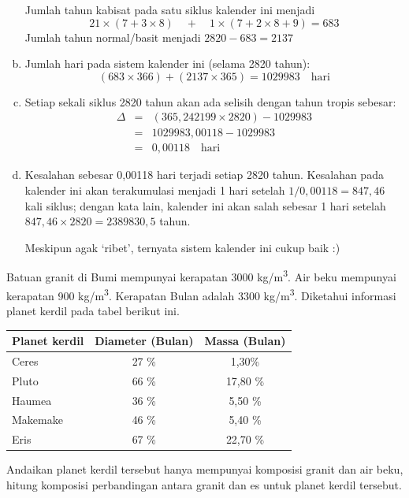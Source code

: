\documentclass[11pt,fleqn]{exam}
\begin{document}
\begin{questions}
\begin{enumerate}[(a)]
Jumlah tahun kabisat pada satu siklus kalender ini menjadi 
$$21 \times (7 + 3 \times 8) \quad + \quad 1 \times (7 + 2 \times 8 + 9) = 683$$
Jumlah tahun normal/basit menjadi $2820 - 683 = 2137$


\item Jumlah hari pada sistem kalender ini (selama 2820 tahun):
$$(683 \times 366) + (2137 \times 365) = 1029983 \quad \text{hari}$$

\item Setiap sekali siklus 2820 tahun akan ada selisih dengan tahun tropis sebesar:
\begin{eqnarray*}
\Delta &=& (365,242199 \times 2820) - 1029983 \\
&=& 1029983,00118 - 1029983 \\
&=& 0,00118 \quad \text{hari}
\end{eqnarray*}

\item Kesalahan sebesar 0,00118 hari terjadi setiap 2820 tahun. Kesalahan pada kalender ini akan terakumulasi menjadi 1 hari setelah $1/0,00118 = 847,46$ kali siklus; dengan kata lain, kalender ini akan salah sebesar 1 hari setelah $847,46 \times 2820 = 2389830,5$ tahun. 

Meskipun agak `ribet', ternyata sistem kalender ini cukup baik :)

\end{enumerate}

\vspace{0.3cm}
\question Batuan granit di Bumi mempunyai kerapatan 3000 kg/m\textsuperscript{3}. Air beku mempunyai kerapatan 900 kg/m\textsuperscript{3}. Kerapatan Bulan adalah 3300 kg/m\textsuperscript{3}. Diketahui informasi planet kerdil pada tabel berikut ini.

\begin{table}[h!]
\centering
\begin{tabular}{|l|c|c|}
\hline
Planet kerdil & Diameter (Bulan) & Massa (Bulan) \\
\hline
\hline
Ceres & 27 \% & 1,30\% \\
\hline
Pluto & 66 \% & 17,80 \% \\
\hline
Haumea & 36 \% & 5,50 \% \\
\hline
Makemake & 46 \% & 5,40 \% \\
\hline
Eris & 67 \% & 22,70 \% \\
\hline
\end{tabular}
\end{table}

Andaikan planet kerdil tersebut hanya mempunyai komposisi granit dan air beku, hitung komposisi perbandingan antara granit dan es untuk planet kerdil tersebut.\\


\end{questions}
\end{document}
